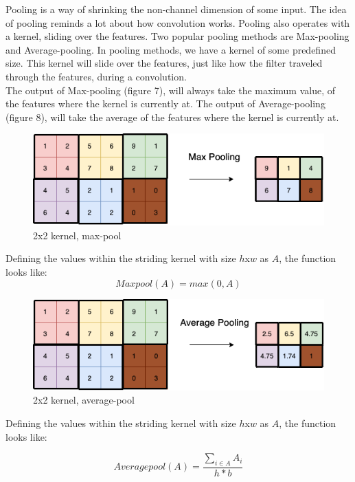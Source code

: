 Pooling is a way of shrinking the non-channel dimension of some input. The idea of pooling reminds a lot about how convolution works. Pooling also operates with a kernel, sliding over the features. Two popular pooling methods are Max-pooling and Average-pooling. In pooling methods, we have a kernel of some predefined size. This kernel will slide over the features, just like how the filter traveled through the features, during a convolution. \\

\noindent
The output of Max-pooling (figure 7), will always take the maximum value, of the features where the kernel is currently at. The output of Average-pooling (figure 8), will take the average of the features where the kernel is currently at. \\


\begin{figure}[!ht]
  \centering
  \includegraphics[scale=0.4]{latex/IMGs/maxpooling.png}
  \caption{2x2 kernel, max-pool}\label{Baseline:before}
\end{figure}

\noindent
Defining the values within the striding kernel with size $h$x$w$ as $A$, the function looks like:
$$
Maxpool(A) = max(0,A)
$$

\begin{figure}[!ht]
  \centering
  \includegraphics[scale=0.4]{latex/IMGs/averagepooling.png}
  \caption{2x2 kernel, average-pool}\label{Baseline:before}
\end{figure}

\noindent
Defining the values within the striding kernel with size $h$x$w$ as $A$, the function looks like:

$$
Averagepool(A) = \frac{\sum_{i \in A} A_i}{h * b}
$$




